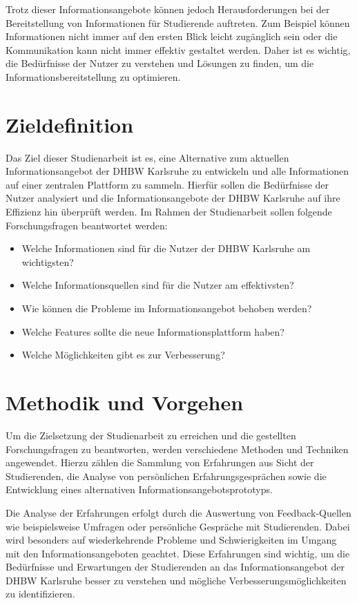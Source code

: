 Trotz dieser Informationsangebote können jedoch Herausforderungen bei der Bereitstellung von Informationen für Studierende auftreten. Zum Beispiel können Informationen nicht immer auf den ersten Blick leicht zugänglich sein oder die Kommunikation kann nicht immer effektiv gestaltet werden. Daher ist es wichtig, die Bedürfnisse der Nutzer zu verstehen und Lösungen zu finden, um die Informationsbereitstellung zu optimieren.


\section{Zieldefinition}
Das Ziel dieser Studienarbeit ist es, eine Alternative zum aktuellen Informationsangebot der DHBW Karlsruhe zu entwickeln und alle Informationen auf einer zentralen Plattform zu sammeln. Hierfür sollen die Bedürfnisse der Nutzer analysiert und die Informationsangebote der DHBW Karlsruhe auf ihre Effizienz hin überprüft werden.
Im Rahmen der Studienarbeit sollen folgende Forschungsfragen beantwortet werden:
\begin{itemize}
	\item Welche Informationen sind für die Nutzer der DHBW Karlsruhe am wichtigsten?
	\item Welche Informationsquellen sind für die Nutzer am effektivsten?
	\item Wie können die Probleme im Informationsangebot behoben werden?
	\item Welche Features sollte die neue Informationsplattform haben?
	\item Welche Möglichkeiten gibt es zur Verbesserung?
\end{itemize}
\newpage
\section{Methodik und Vorgehen}
Um die Zielsetzung der Studienarbeit zu erreichen und die gestellten Forschungsfragen zu beantworten, werden verschiedene Methoden und Techniken angewendet. Hierzu zählen die Sammlung von Erfahrungen aus Sicht der Studierenden, die Analyse von persönlichen Erfahrungsgesprächen sowie die Entwicklung eines alternativen Informationsangebotsprototyps.

Die Analyse der Erfahrungen erfolgt durch die Auswertung von Feedback-Quellen wie beispielsweise Umfragen oder persönliche Gespräche mit Studierenden. Dabei wird besonders auf wiederkehrende Probleme und Schwierigkeiten im Umgang mit den Informationsangeboten geachtet. Diese Erfahrungen sind wichtig, um die Bedürfnisse und Erwartungen der Studierenden an das Informationsangebot der DHBW Karlsruhe besser zu verstehen und mögliche Verbesserungsmöglichkeiten zu identifizieren.

